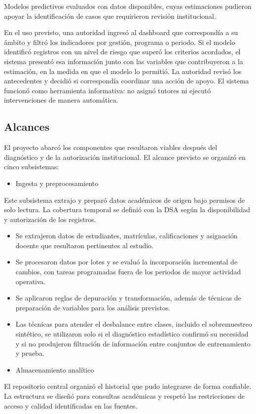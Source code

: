 \documentclass[11pt,oneside,openany]{book}
\begin{document}
Modelos predictivos evaluados con datos disponibles, cuyas estimaciones pudieron apoyar la identificación de casos que requirieron revisión institucional.

En el uso previsto, una autoridad ingresó al dashboard que correspondía a su ámbito y filtró los indicadores por gestión, programa o periodo. Si el modelo identificó registros con un nivel de riesgo que superó los criterios acordados, el sistema presentó esa información junto con las variables que contribuyeron a la estimación, en la medida en que el modelo lo permitió. La autoridad revisó los antecedentes y decidió si correspondía coordinar una acción de apoyo. El sistema funcionó como herramienta informativa: no asignó tutores ni ejecutó intervenciones de manera automática.

\subsection*{Alcances}

El proyecto abarcó los componentes que resultaron viables después del diagnóstico y de la autorización institucional. El alcance previsto se organizó en cinco subsistemas:

\begin{itemize}[leftmargin=*]
\item Ingesta y preprocesamiento
\end{itemize}
Este subsistema extrajo y preparó datos académicos de origen bajo permisos de solo lectura. La cobertura temporal se definió con la DSA según la disponibilidad y autorización de los registros.

\begin{itemize}[leftmargin=*]
\item Se extrajeron datos de estudiantes, matrículas, calificaciones y asignación docente que resultaron pertinentes al estudio.
\item Se procesaron datos por lotes y se evaluó la incorporación incremental de cambios, con tareas programadas fuera de los periodos de mayor actividad operativa.
\item Se aplicaron reglas de depuración y transformación, además de técnicas de preparación de variables para los análisis previstos.
\item Las técnicas para atender el desbalance entre clases, incluido el sobremuestreo sintético, se utilizaron solo si el diagnóstico estadístico confirmó su necesidad y si no produjeron filtración de información entre conjuntos de entrenamiento y prueba.
\item Almacenamiento analítico
\end{itemize}
El repositorio central organizó el historial que pudo integrarse de forma confiable. La estructura se diseñó para consultas académicas y respetó las restricciones de acceso y calidad identificadas en las fuentes.
\end{document}
